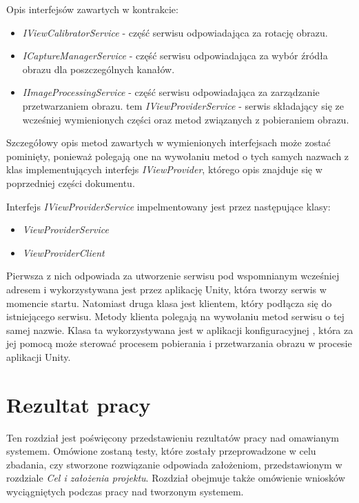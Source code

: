 \documentclass[a4paper,11pt,twoside]{report}
\theoremstyle{definition}
\begin{document}
Opis interfejsów zawartych w kontrakcie:
\begin{itemize}
\item \textit{IViewCalibratorService} - część serwisu odpowiadająca za rotację obrazu.
\item \textit{ICaptureManagerService} - część serwisu odpowiadająca za wybór źródła obrazu dla poszczególnych kanałów.
\item \textit{IImageProcessingService} - część serwisu odpowiadająca za zarządzanie przetwarzaniem obrazu.
tem \textit{IViewProviderService} - serwis składający się ze wcześniej wymienionych części oraz metod związanych z pobieraniem obrazu.
\end{itemize}

Szczegółowy opis metod zawartych w wymienionych interfejsach może zostać pominięty, ponieważ polegają one na wywołaniu metod o tych samych nazwach z klas implementujących interfejs \textit{IViewProvider}, którego opis znajduje się w poprzedniej części dokumentu.

Interfejs \textit{IViewProviderService} impelmentowany jest przez następujące klasy:

\begin{itemize}
\item \textit{ViewProviderService}
\item \textit{ViewProviderClient}
\end{itemize}

Pierwsza z nich odpowiada za utworzenie serwisu pod wspomnianym wcześniej adresem i wykorzystywana jest przez aplikację Unity, która tworzy serwis w momencie startu.
Natomiast druga klasa jest klientem, który podłącza się do istniejącego serwisu. Metody klienta polegają na wywołaniu metod serwisu o tej samej nazwie. Klasa ta wykorzystywana jest w aplikacji konfiguracyjnej , która za jej pomocą  może sterować procesem pobierania i przetwarzania obrazu w procesie aplikacji Unity.

 

\chapter{Rezultat pracy}
Ten rozdział jest poświęcony przedstawieniu rezultatów pracy nad omawianym systemem. Omówione zostaną testy, które zostały przeprowadzone w celu zbadania, czy stworzone rozwiązanie odpowiada założeniom, przedstawionym w rozdziale \textit{Cel i założenia projektu}. Rozdział obejmuje także omówienie wniosków wyciągniętych podczas pracy nad tworzonym systemem. 
\end{document}
